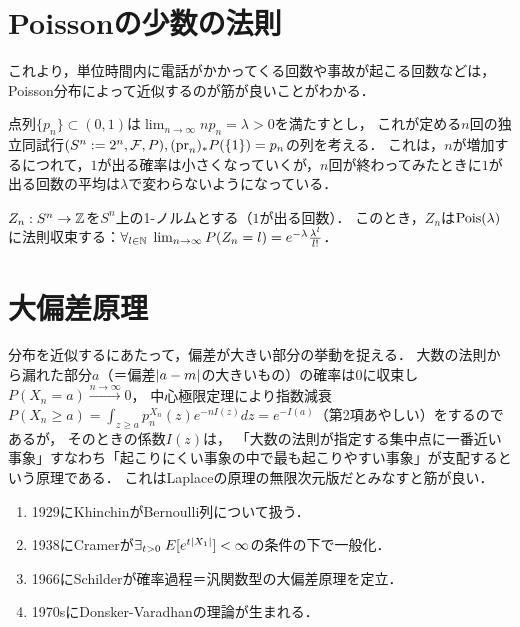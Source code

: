 \documentclass[uplatex,dvipdfmx]{jsreport}
\begin{document}
\section{Poissonの少数の法則}

\begin{notation}
    これより，単位時間内に電話がかかってくる回数や事故が起こる回数などは，Poisson分布によって近似するのが筋が良いことがわかる．
\end{notation}

\begin{notation}
    点列$\{p_n\}\subset(0,1)$は$\lim_{n\to\infty}np_n=\lambda>0$を満たすとし，
    これが定める$n$回の独立同試行$(S^n:=2^n,\mathcal{F},P),(\mathrm{pr}_n)_*P(\{1\})=p_n$の列を考える．
    これは，$n$が増加するにつれて，$1$が出る確率は小さくなっていくが，$n$回が終わってみたときに$1$が出る回数の平均は$\lambda$で変わらないようになっている．
\end{notation}

\begin{theorem}
    $Z_n:S^n\to\mathbb{Z}$を$S^n$上の1-ノルムとする（$1$が出る回数）．
    このとき，$Z_n$は$\mathrm{Pois}(\lambda)$に法則収束する：$\forall_{l\in\mathbb{N}}\;\lim_{n\to\infty}P(Z_n=l)=e^{-\lambda}\frac{\lambda^l}{l!}$．
\end{theorem}

\section{大偏差原理}

\begin{tcolorbox}[colframe=ForestGreen, colback=ForestGreen!10!white,breakable,colbacktitle=ForestGreen!40!white,coltitle=black,fonttitle=\bfseries\sffamily,
    title=無限次元空間におけるLaplace原理]
    分布を近似するにあたって，偏差が大きい部分の挙動を捉える．
    大数の法則から漏れた部分$a$（＝偏差$\lvert a-m\rvert$の大きいもの）の確率は$0$に収束し$P(X_n=a)\xrightarrow{n\to\infty}0$，
    中心極限定理により指数減衰$P(X_n\ge a)=\int_{z\ge a}p_n^{X_n}(z)e^{-nI(z)}dz=e^{-I(a)}$（第2項あやしい）をするのであるが，
    そのときの係数$I(z)$は，
    「大数の法則が指定する集中点に一番近い事象」すなわち「起こりにくい事象の中で最も起こりやすい事象」が支配するという原理である．
    これはLaplaceの原理の無限次元版だとみなすと筋が良い．
\end{tcolorbox}

\begin{history}\mbox{}
    \begin{enumerate}
        \item 1929にKhinchinがBernoulli列について扱う．
        \item 1938にCramerが$\exists_{t>0}\;E[e^{t\lvert X_1\rvert}]<\infty$の条件の下で一般化．
        \item 1966にSchilderが確率過程＝汎関数型の大偏差原理を定立．
        \item 1970sにDonsker-Varadhanの理論が生まれる．
    \end{enumerate}
\end{history}
\end{document}
